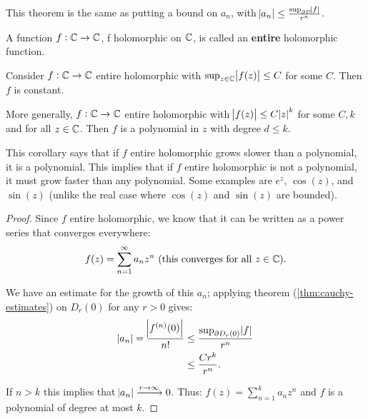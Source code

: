 \begin{note}
This theorem is the same as putting a bound on $a_n$, with $\abs{a_n} \leq \frac{\sup_{\partial D}\abs{f}}{r^n}$.
\end{note}


\begin{definition}
A function $f:\mathbb{C} \to \mathbb{C}$, f holomorphic on $\mathbb{C}$, is called an \textbf{entire} holomorphic function.
\end{definition}


\begin{corollary}[Liouville]\label{cor:liouville}

Consider $f:\mathbb{C} \to \mathbb{C}$ entire holomorphic with $\sup_{z\in \mathbb{C}}\abs{f(z)} \leq C$ for some $C$. Then $f$ is constant.

More generally, $f:\mathbb{C} \to \mathbb{C}$ entire holomorphic with $\abs{f(z)} \leq C\abs{z}^k$ for some $C, k$ and for all $z \in \mathbb{C}$. Then $f$ is a polynomial in $z$ with degree $d\leq k$.

\end{corollary}


\begin{note}
This corollary says that if $f$ entire holomorphic grows slower than a polynomial, it is a polynomial. This implies that if $f$ entire holomorphic is not a polynomial, it must grow faster than any polynomial. Some examples are $e^z$, $\cos(z)$, and $\sin(z)$ (unlike the real case where $\cos(z)$ and $\sin(z)$ are bounded).
\end{note}

\begin{proof}
Since $f$ entire holomorphic, we know that it can be written as a power series that converges everywhere:
\begin{align*}
    f(z) = \sum_{n=1}^\infty a_n z^n \text{ (this converges for all $z\in \mathbb{C}$)}.
\end{align*}

We have an estimate for the growth of this $a_n$; applying theorem (\ref{thm:cauchy-estimates}) on $D_r(0)$ for any $r>0$ gives:
\begin{align*}
    \abs{a_n} = \frac{\abs{f^{(n)} (0)  }}{n!} &\leq \frac{\sup_{\partial D_r(0)}\abs{f}}{r^n}\\
    &\leq \frac{Cr^k}{r^n}.
\end{align*}

If $n>k$ this implies that $\abs{a_n} \xrightarrow[]{r\to \infty} 0$. Thus: $f(z) = \sum_{n=1}^{k} a_n z^n$ and $f$ is a polynomial of degree at most $k$.

\end{proof}

